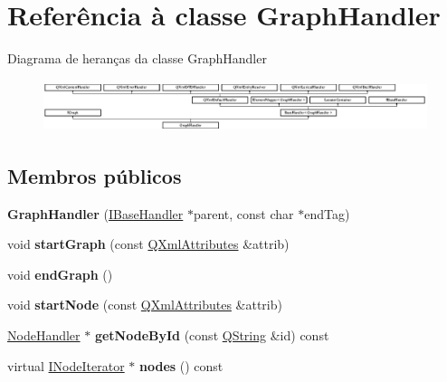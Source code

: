 \hypertarget{class_graph_handler}{\section{Referência à classe Graph\-Handler}
\label{class_graph_handler}
}
Diagrama de heranças da classe Graph\-Handler\begin{figure}[H]
\begin{center}
\leavevmode
\includegraphics[height=1.509434cm]{class_graph_handler}
\end{center}
\end{figure}
\subsection*{Membros públicos}
\begin{DoxyCompactItemize}
\item 
\hypertarget{class_graph_handler_afcfc92ea70569c61889a466f09e40c4c}{{\bfseries Graph\-Handler} (\hyperlink{class_i_base_handler}{I\-Base\-Handler} $\ast$parent, const char $\ast$end\-Tag)}\label{class_graph_handler_afcfc92ea70569c61889a466f09e40c4c}

\item 
\hypertarget{class_graph_handler_a60b5c5f6660b99d927aec6e3d7c57add}{void {\bfseries start\-Graph} (const \hyperlink{class_q_xml_attributes}{Q\-Xml\-Attributes} \&attrib)}\label{class_graph_handler_a60b5c5f6660b99d927aec6e3d7c57add}

\item 
\hypertarget{class_graph_handler_adbb8cad490f1653019277c60b353d5cb}{void {\bfseries end\-Graph} ()}\label{class_graph_handler_adbb8cad490f1653019277c60b353d5cb}

\item 
\hypertarget{class_graph_handler_a83956918f974591de4c7abe4f194060c}{void {\bfseries start\-Node} (const \hyperlink{class_q_xml_attributes}{Q\-Xml\-Attributes} \&attrib)}\label{class_graph_handler_a83956918f974591de4c7abe4f194060c}

\item 
\hypertarget{class_graph_handler_a0d4a97971c99c73b47a63b93250f88dc}{\hyperlink{class_node_handler}{Node\-Handler} $\ast$ {\bfseries get\-Node\-By\-Id} (const \hyperlink{class_q_string}{Q\-String} \&id) const }\label{class_graph_handler_a0d4a97971c99c73b47a63b93250f88dc}

\item 
\hypertarget{class_graph_handler_a835f764d0f939028f4baa62adea6a3e4}{virtual \hyperlink{class_i_node_iterator}{I\-Node\-Iterator} $\ast$ {\bfseries nodes} () const }\label{class_graph_handler_a835f764d0f939028f4baa62adea6a3e4}

\end{DoxyCompactItemize}
